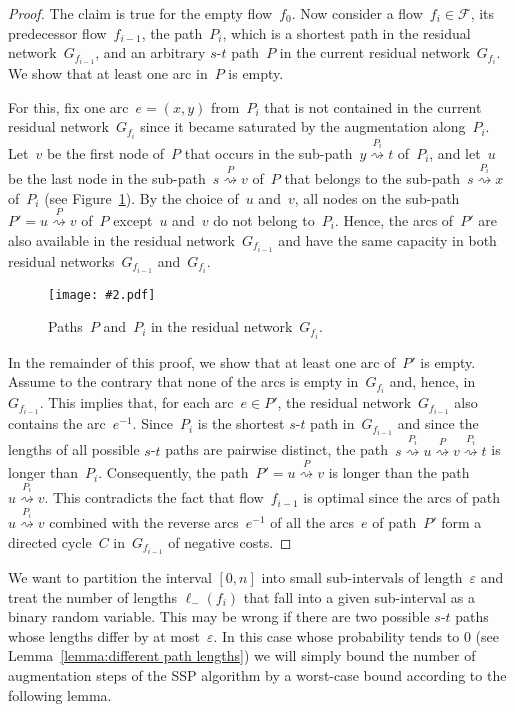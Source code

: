 \documentclass[11pt]{article}
\newcommand{\F}{\mathcal{F}}
\newcommand{\e}{\varepsilon}
\renewcommand{\sp}{\ell}
\newcommand{\PATH}[1][]{\stackrel{#1}{\rightsquigarrow}}
\newcommand{\spm}[1][]{\sp^{#1}_{-}}
\newcommand{\GFX}[2][]{\texttt{[image: \#2.pdf]}}
\newenvironment{fig}
{\begin{figure}[th]\begin{center}}
{\end{center}\end{figure}}
\newenvironment{GFXFIG}[2][]
{\begin{fig}\GFX[#1]{#2}}
{\end{fig}}
\begin{document}
\begin{proof}\renewcommand{\P}{P'}
The claim is true for the empty flow~$f_0$. Now consider a flow~$f_i \in \F$, its predecessor flow~$f_{i-1}$, the path~$P_i$, which is a shortest path in the residual network~$G_{f_{i-1}}$, and an arbitrary $s$-$t$ path~$P$ in the current residual network~$G_{f_i}$. We show that at least one arc in~$P$ is empty.

For this, fix one arc~$e = (x, y)$ from~$P_i$ that is not contained in the current residual network~$G_{f_i}$ since it became saturated by the augmentation along~$P_i$. Let~$v$ be the first node of~$P$ that occurs in the sub-path~$y \PATH[P_i] t$ of~$P_i$, and let~$u$ be the last node in the sub-path~$s \PATH[P] v$ of~$P$ that belongs to the sub-path~$s \PATH[P_i] x$ of~$P_i$ (see Figure~\ref{fig:one empty arc}). By the choice of~$u$ and~$v$, all nodes on the sub-path~$\P = u \PATH[P] v$ of~$P$ except~$u$ and~$v$ do not belong to~$P_i$. Hence, the arcs of~$\P$ are also available in the residual network~$G_{f_{i-1}}$ and have
the same capacity in both residual networks~$G_{f_{i-1}}$ and~$G_{f_i}$.

\begin{GFXFIG}[width=0.6\textwidth]{OneEmptyArc}
\caption{Paths~$P$ and~$P_i$ in the residual network~$G_{f_i}$.}
\label{fig:one empty arc}
\end{GFXFIG}

In the remainder of this proof,
we show that at least one arc of~$\P$ is empty. Assume to the contrary
that none of the arcs is empty in~$G_{f_i}$ and, hence, in~$G_{f_{i-1}}$. This implies that, for each arc~$e \in \P$, the residual network~$G_{f_{i-1}}$ also contains the arc~$e^{-1}$. Since~$P_i$ is the shortest $s$-$t$ path in~$G_{f_{i-1}}$ and since the lengths of all possible $s$-$t$ paths are pairwise distinct, the path~$s \PATH[P_i] u \PATH[P] v \PATH[P_i] t$ is longer than~$P_i$. Consequently, the path~$\P = u \PATH[P] v$ is longer than the path~$u \PATH[P_i] v$. This contradicts the fact that flow~$f_{i-1}$ is optimal since the arcs of path~$u \PATH[P_i] v$ combined with the reverse arcs~$e^{-1}$ of all the arcs~$e$ of path~$\P$ form a directed cycle~$C$ in~$G_{f_{i-1}}$ of negative costs. \end{proof}

We want to partition the interval $[0, n]$ into small sub-intervals of length~$\e$ and treat the number of lengths $\spm(f_i)$ that fall into a given sub-interval as a binary random variable. This may be wrong if there are two possible $s$-$t$ paths whose lengths differ by at most~$\e$. In this case whose probability tends to $0$ (see Lemma~\ref{lemma:different path lengths}) we will simply bound the number of augmentation steps of the SSP algorithm by a worst-case bound according to the following lemma.
\end{document}

